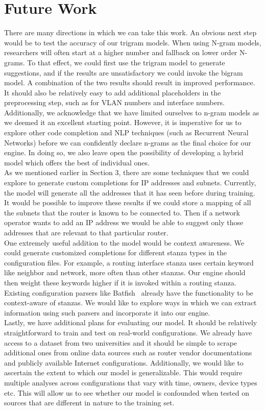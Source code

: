 \section{Future Work}
There are many directions in which we can take this work. An obvious next step would be to test the accuracy of our trigram models. When using N-gram models, researchers will often start at a higher number and fallback on lower order N-grams. To that effect, we could first use the trigram model to generate suggestions, and if the results are unsatisfactory we could invoke the bigram model. A combination of the two results should result in improved performance. It should also be relatively easy to add additional placeholders in the preprocessing step, such as for VLAN numbers and interface numbers. Additionally, we acknowledge that we have limited ourselves to n-gram models as we deemed it an excellent starting point. However, it is imperative for us to explore other code completion and NLP techniques (such as Recurrent Neural Networks) before we can confidently declare n-grams as the final choice for our engine. In doing so, we also leave open the possibility of developing a hybrid model which offers the best of individual ones.\\

As we mentioned earlier in Section 3, there are some techniques that we could explore to generate custom completions for IP addresses and subnets. Currently, the model will generate all the addresses that it has seen before during training. It would be possible to improve these results if we could store a mapping of all the subnets that the router is known to be connected to. Then if a network operator wants to add an IP address we would be able to suggest only those addresses that are relevant to that particular router.\\

One extremely useful addition to the model would be context awareness. We could generate customized completions for different stanza types in the configuration files. For example, a routing interface stanza uses certain keyword like neighbor and network, more often than other stanzas. Our engine should then weight these keywords higher if it is invoked within a routing stanza. Existing configuration parsers like Batfish~\cite{batfish} already have the functionality to be context-aware of stanzas. We would like to explore ways in which we can extract information using such parsers and incorporate it into our engine.\\ 

Lastly, we have additional plans for evaluating our model. It should be relatively straightforward to train and test on real-world configurations. We already have access to a dataset from two universities and it should be simple to scrape additional ones from online data sources such as router vendor documentations and publicly available Internet configurations. Additionally, we would like to ascertain the extent to which our model is generalizable. This would require multiple analyses across configurations that vary with time, owners, device types etc. This will allow us to see whether our model is confounded when tested on sources that are different in nature to the training set. 